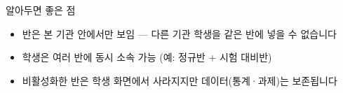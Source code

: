 \begin{tipbox}{알아두면 좋은 점}
\begin{itemize}[leftmargin=1.2em]
  \item 반은 본 기관 안에서만 보임 — 다른 기관 학생을 같은 반에 넣을 수 없습니다
  \item 학생은 여러 반에 동시 소속 가능 (예: 정규반 + 시험 대비반)
  \item 비활성화한 반은 학생 화면에서 사라지지만 데이터(통계·과제)는 보존됩니다
\end{itemize}
\end{tipbox}
